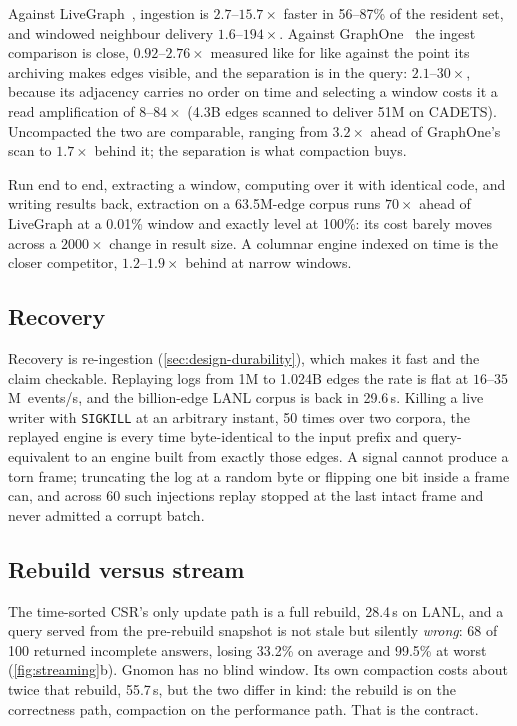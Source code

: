 \documentclass[letterpaper,twocolumn,10pt]{article}
\newcommand{\sys}{Gnomon\xspace}
\begin{document}
Against LiveGraph~\cite{zhu2020livegraph}, ingestion is
$2.7$--$15.7\times$ faster in 56--87\% of the resident set, and windowed
neighbour delivery $1.6$--$194\times$. Against
GraphOne~\cite{kumar2019graphone} the ingest comparison is close,
$0.92$--$2.76\times$ measured like for like against the point its
archiving makes edges visible, and the separation is in the query:
$2.1$--$30\times$, because its adjacency carries no order on time and
selecting a window costs it a read amplification of $8$--$84\times$
(4.3B edges scanned to deliver 51M on CADETS). Uncompacted the two are
comparable, ranging from $3.2\times$ ahead of GraphOne's scan to
$1.7\times$ behind it; the separation is what compaction buys.

Run end to end, extracting a window, computing over it with identical
code, and writing results back, extraction on a 63.5M-edge corpus runs
$70\times$ ahead of LiveGraph at a 0.01\% window and exactly level at
100\%: its cost barely moves across a $2000\times$ change in result
size. A columnar engine indexed on time is the closer competitor,
$1.2$--$1.9\times$ behind at narrow windows.

\subsection{Recovery}
\label{sec:eval-recovery}
Recovery is re-ingestion (\cref{sec:design-durability}), which makes it
fast and the claim checkable. Replaying logs from 1M to 1.024B edges
the rate is flat at $16$--$35$M~events/s, and the billion-edge LANL
corpus is back in 29.6\,s. Killing a live writer with \texttt{SIGKILL}
at an arbitrary instant, 50 times over two corpora, the replayed engine
is every time byte-identical to the input prefix and query-equivalent
to an engine built from exactly those edges. A signal cannot produce a
torn frame; truncating the log at a random byte or flipping one bit
inside a frame can, and across 60 such injections replay stopped at the
last intact frame and never admitted a corrupt batch.

\subsection{Rebuild versus stream}
\label{sec:eval-stream}
The time-sorted CSR's only update path is a full rebuild, 28.4\,s on
LANL, and a query served from the pre-rebuild snapshot is not stale but
silently \emph{wrong}: 68 of 100 returned incomplete answers, losing
33.2\% on average and 99.5\% at worst (\cref{fig:streaming}b). \sys has
no blind window. Its own compaction costs about twice that rebuild,
55.7\,s, but the two differ in kind: the rebuild is on the correctness
path, compaction on the performance path. That is the contract.
\end{document}
